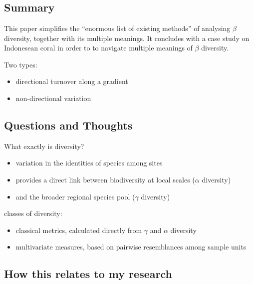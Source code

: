 \documentclass[references.tex]{subfiles}
\begin{document}
\section{\citep{AndCri2011}}
\subsection{Summary}

This paper simplifies the ``enormous list of existing methods'' of 
analysing $\beta$ diversity, together with its multiple meanings. It 
concludes with a case study on Indonesean coral 
in order to to navigate multiple meanings of $\beta$ diversity.

Two types:
\begin{itemize}
    \item directional turnover along a gradient
    \item non-directional variation
\end{itemize}


\subsection{Questions and Thoughts}
\noindent
What exactly is \textbeta{} diversity?
\begin{itemize}
    \item variation in the identities of species among sites
    \item provides a direct link between biodiversity at local scales 
          ($\alpha$ diversity)
    \item and the broader regional species pool ($\gamma$ diversity)
\end{itemize}

\noindent
classes of \textbeta{} diversity:
\begin{itemize}
    \item classical metrics, calculated directly from $\gamma$ and $\alpha$ diversity
    \item multivariate measures, based on pairwise resemblances among sample units
\end{itemize}
\subsection{How this relates to my research}
\end{document}
